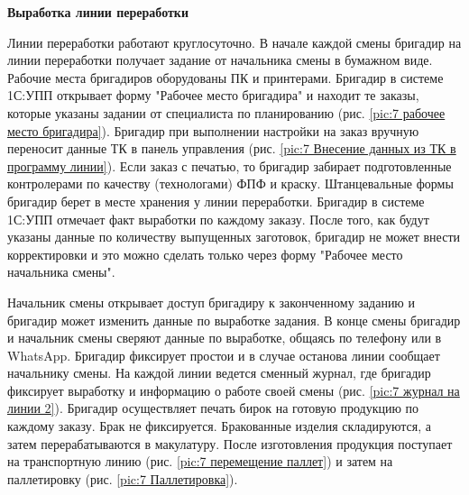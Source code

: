 



\textbf{Выработка линии переработки}

Линии переработки работают круглосуточно. В начале каждой смены бригадир на линии переработки получает задание от начальника смены в бумажном виде. Рабочие места бригадиров оборудованы ПК и принтерами.  Бригадир в системе 1С:УПП открывает форму "Рабочее место бригадира" и находит те заказы, которые указаны задании от специалиста по планированию (рис. \ref{pic:7 рабочее место бригадира}). Бригадир при выполнении настройки на заказ вручную переносит данные ТК в панель управления (рис. \ref{pic:7 Внесение данных из ТК в программу линии}). Если заказ с печатью, то бригадир забирает подготовленные контролерами по качеству (технологами) ФПФ и краску. Штанцевальные формы бригадир берет в месте хранения у линии переработки. Бригадир в системе 1С:УПП отмечает факт выработки по каждому заказу. После того, как будут указаны данные по количеству выпущенных заготовок, бригадир не может внести корректировки и это можно сделать только через форму "Рабочее место начальника смены". 

Начальник смены открывает доступ бригадиру к законченному заданию и бригадир может изменить данные по выработке задания. В конце смены бригадир и начальник смены сверяют данные по выработке, общаясь по телефону или в WhatsApp. Бригадир фиксирует простои и в случае останова линии сообщает начальнику смены. На каждой линии ведется сменный журнал, где бригадир фиксирует выработку и информацию о работе своей смены (рис. \ref{pic:7 журнал на линии 2}). Бригадир осуществляет печать бирок на готовую продукцию по каждому заказу. Брак не фиксируется. Бракованные изделия складируются, а затем перерабатываются в макулатуру. 
После изготовления продукция поступает на транспортную линию (рис. \ref{pic:7 перемещение паллет}) и затем на паллетировку (рис. \ref{pic:7 Паллетировка}).

